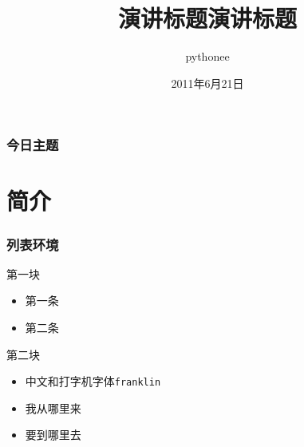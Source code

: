 \documentclass[hyperref={bookmarks=false},CJK]{beamer}
\title{演讲标题}
\author{pythonee}
\date{2011年6月21日}
\institute{系统架构部}
\title[\href{mailto:pythonee@gmail.coim}{pythonee@gmail.com}\hspace{3cm}\insertframenumber/\inserttotalframenumber]{演讲标题}
\begin{document}
\maketitle

\begin{frame}
  \frametitle{今日主题}
  \setcounter{tocdepth}{3}
  \tableofcontents
\end{frame}

\section{简介}
\label{sec-1}
\begin{frame}
  \frametitle{列表环境}
  \label{sec-1-1}
  \begin{block}{第一块}
    \label{sec-1-1-1}

    \begin{itemize}
      \item 第一条
      \item 第二条
    \end{itemize}
  \end{block}
  \begin{block}{第二块}
    \label{sec-1-1-2}

    \begin{itemize}
      \item 中文和打字机字体\texttt{franklin}
      \item 我从哪里来
      \item 要到哪里去
    \end{itemize}
  \end{block}
\end{frame}
\end{document}
